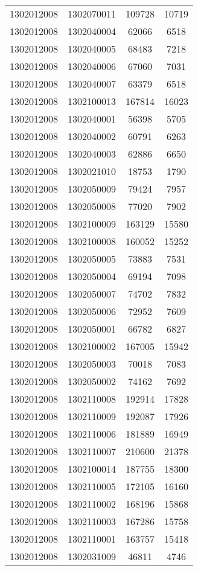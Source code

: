 \begin{longtable}{llcc}
1302012008 & 1302070011 & 109728 & 10719\\
1302012008 & 1302040004 & 62066 & 6518\\
1302012008 & 1302040005 & 68483 & 7218\\
1302012008 & 1302040006 & 67060 & 7031\\
1302012008 & 1302040007 & 63379 & 6518\\
1302012008 & 1302100013 & 167814 & 16023\\
1302012008 & 1302040001 & 56398 & 5705\\
1302012008 & 1302040002 & 60791 & 6263\\
1302012008 & 1302040003 & 62886 & 6650\\
1302012008 & 1302021010 & 18753 & 1790\\
1302012008 & 1302050009 & 79424 & 7957\\
1302012008 & 1302050008 & 77020 & 7902\\
1302012008 & 1302100009 & 163129 & 15580\\
1302012008 & 1302100008 & 160052 & 15252\\
1302012008 & 1302050005 & 73883 & 7531\\
1302012008 & 1302050004 & 69194 & 7098\\
1302012008 & 1302050007 & 74702 & 7832\\
1302012008 & 1302050006 & 72952 & 7609\\
1302012008 & 1302050001 & 66782 & 6827\\
1302012008 & 1302100002 & 167005 & 15942\\
1302012008 & 1302050003 & 70018 & 7083\\
1302012008 & 1302050002 & 74162 & 7692\\
1302012008 & 1302110008 & 192914 & 17828\\
1302012008 & 1302110009 & 192087 & 17926\\
1302012008 & 1302110006 & 181889 & 16949\\
1302012008 & 1302110007 & 210600 & 21378\\
1302012008 & 1302100014 & 187755 & 18300\\
1302012008 & 1302110005 & 172105 & 16160\\
1302012008 & 1302110002 & 168196 & 15868\\
1302012008 & 1302110003 & 167286 & 15758\\
1302012008 & 1302110001 & 163757 & 15418\\
1302012008 & 1302031009 & 46811 & 4746\\

\end{longtable}
